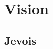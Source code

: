 \documentclass[../../main.tex]{subfiles}
\begin{document}
    \section{Vision}
    \subsection{Jevois}
    
    
    
\end{document}
